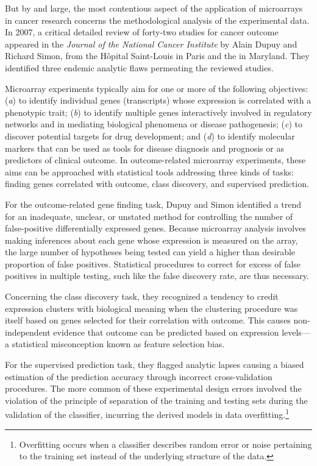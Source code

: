 But by and large, the most contentious aspect of the application of microarrays
in cancer research concerns the methodological analysis of the experimental
data.  In 2007, a critical detailed review of \mbox{forty-two} studies for
cancer outcome appeared in the \emph{Journal of the National Cancer Institute}
by Alain Dupuy and Richard Simon, from the Hôpital Saint-Louis in Paris and the
 in Maryland.\cite{dupuy_critical_2007} They
identified three endemic analytic flaws permeating the reviewed studies.

Microarray experiments typically aim for one or more of the following
objectives: (\emph{a}) to identify individual genes (transcripts) whose
expression is correlated with a phenotypic trait; (\emph{b}) to identify
multiple genes interactively involved in regulatory networks and in mediating
biological phenomena or disease pathogenesis; (\emph{c}) to discover potential
targets for drug development; and (\emph{d}) to identify molecular markers that
can be used as tools for disease diagnosis and prognosis or as predictors of
clinical outcome.\cite{kim_expectations_2010} In \mbox{outcome-related}
microarray experiments, these aims can be approached with statistical tools
addressing three kinds of tasks: finding genes correlated with outcome, class
discovery, and supervised prediction.

For the outcome-related gene finding task, Dupuy and Simon identified a trend
for an inadequate, unclear, or unstated method for controlling the number of
\mbox{false-positive} differentially expressed genes.  Because microarray
analysis involves making inferences about each gene whose expression is measured
on the array, the large number of hypotheses being tested can yield a higher
than desirable proportion of false positives.  Statistical procedures to correct
for excess of false positives in multiple testing, such like the false discovery
rate, are thus necessary.\cite{benjamini_controlling_1995,noble_how_2009}

Concerning the class discovery task, they recognized a tendency to credit
expression clusters with biological meaning when the clustering procedure was
itself based on genes selected for their correlation with outcome.  This causes
non-independent evidence that outcome can be predicted based on expression
levels---a statistical misconception known as feature selection
bias.\cite{ambroise_selection_2002}

For the supervised prediction task, they flagged analytic lapses causing a
biased estimation of the prediction accuracy through incorrect cross-validation
procedures.  The more common of these experimental design errors involved the
violation of the principle of separation of the training and testing sets during
the validation of the classifier, incurring the derived models in data
overfitting.\footnote{Overfitting occurs when a classifier describes random
  error or noise pertaining to the training set instead of the underlying
  structure of the data.}

